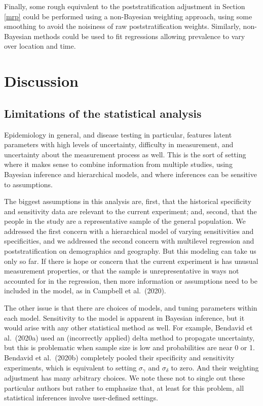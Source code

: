 \documentclass[11pt]{article}
\begin{document}
Finally, some rough equivalent to the poststratification adjustment in Section \ref{mrp} could be performed using a non-Bayesian weighting approach, using some smoothing to avoid the noisiness of raw poststratification weights.  Similarly, non-Bayesian methods could be used to fit regressions allowing prevalence to vary over location and time.

\section{Discussion}


\subsection{Limitations of the statistical analysis}


Epidemiology in general, and disease testing in particular, features latent parameters with high levels of uncertainty, difficulty in measurement, and uncertainty about the measurement process as well.  This is the sort of setting where it makes sense to combine information from multiple studies, using Bayesian inference and hierarchical models, and where inferences can be sensitive to assumptions.

The biggest assumptions in this analysis are, first, that the historical specificity and sensitivity data are relevant to the current experiment; and, second, that the people in the study are a representative sample of the general population.  We addressed the first concern with a hierarchical model of varying sensitivities and specificities, and we addressed the second concern with multilevel regression and poststratification on demographics and geography.  But this modeling can take us only so far.  If there is hope or concern that the current experiment is has unusual measurement properties, or that the sample is unrepresentative in ways not accounted for in the regression, then more information or assumptions need to be included in the model, as in Campbell et al.\ (2020).

The other issue is that there are choices of models, and tuning parameters within each model.  Sensitivity to the model is apparent in Bayesian inference, but it would arise with any other statistical method as well.  For example, Bendavid et al.\ (2020a) used an (incorrectly applied) delta method to propagate uncertainty, but this is problematic when sample size is low and probabilities are near 0 or 1.  Bendavid  et al.\ (2020b) completely pooled their specificity and sensitivity experiments, which is equivalent to setting $\sigma_{\gamma}$ and $\sigma_{\delta}$ to zero.  And their weighting adjustment has many arbitrary choices.  We note these not to single out these particular authors but rather to emphasize that, at least for this problem, all statistical inferences involve user-defined settings.
\end{document}
